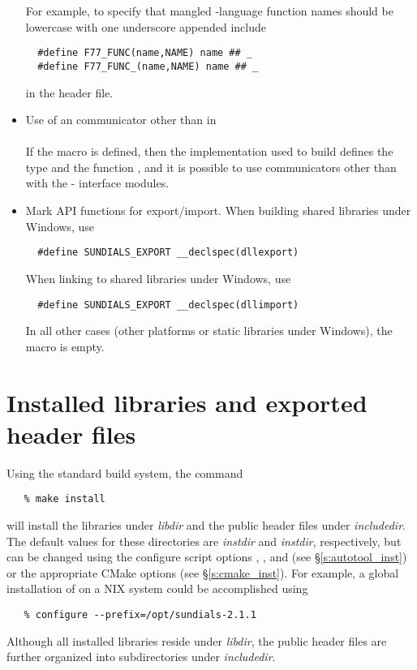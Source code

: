 \begin{itemize}
  For example, to specify that mangled {\C}-language function names
  should be lowercase with one underscore appended include
\begin{verbatim}
  #define F77_FUNC(name,NAME) name ## _
  #define F77_FUNC_(name,NAME) name ## _
\end{verbatim}
  in the  header file.

\item Use of an {\mpi} communicator other than  in {\F}\\ \\
  If the macro  is defined, then the
  {\mpi} implementation used to build {\sundials} defines the type
   and the function , and it is
  possible to use {\mpi} communicators other than
   with the {\F}-{\C} interface modules.

\item Mark {\sundials} API functions for export/import.
  When building shared {\sundials} libraries under Windows, use
\begin{verbatim}
  #define SUNDIALS_EXPORT __declspec(dllexport)
\end{verbatim}
  When linking to shared {\sundials} libraries under Windows, use
\begin{verbatim}
  #define SUNDIALS_EXPORT __declspec(dllimport)
\end{verbatim}
  In all other cases (other platforms or static libraries under Windows), 
  the  macro is empty.

\end{itemize}


\section{Installed libraries and exported header files}

Using the standard {\sundials} build system, the command
\begin{verbatim}
   % make install
\end{verbatim}
will install the libraries under {\em libdir} and the public header
files under {\em includedir}. The default values for these directories are
{\em instdir} and {\em instdir},
respectively, but can be changed using the configure script options
, ,  and  
(see \S\ref{s:autotool_inst}) or the appropriate CMake options
(see \S\ref{s:cmake_inst}). For example, a global installation
of {\sundials} on a {\sc *NIX} system could be accomplished using
\begin{verbatim}
   % configure --prefix=/opt/sundials-2.1.1
\end{verbatim}
Although all installed libraries reside under {\em libdir}, the public header files
are further organized into subdirectories under {\em includedir}.

